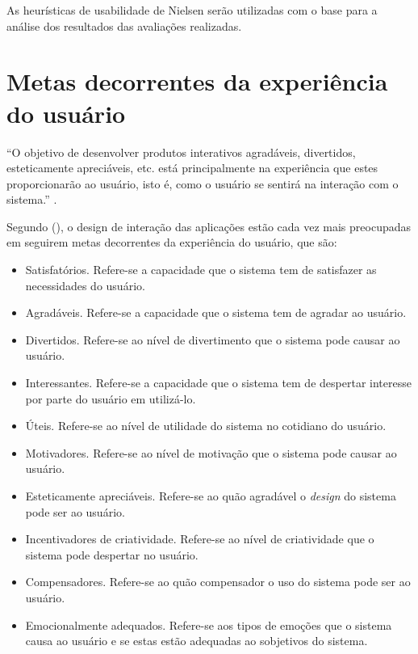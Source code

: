     As heurísticas de usabilidade de Nielsen serão utilizadas com o base para a análise dos resultados das avaliações realizadas.
      
  \section{Metas decorrentes da experiência do usuário}
    
    “O objetivo de desenvolver produtos interativos agradáveis, divertidos, esteticamente apreciáveis, etc. 
    está principalmente na experiência que estes proporcionarão ao usuário, isto é, como o usuário se 
    sentirá na interação com o sistema.” \cite{preece}.
    
    Segundo \citeauthor{preece} (\citeyear{preece}), o design de interação das aplicações estão cada vez mais preocupadas em seguirem 
    metas decorrentes da experiência do usuário, que são:
    
    \begin{itemize}
       \item Satisfatórios.
       \subitem Refere-se a capacidade que o sistema tem de satisfazer as necessidades do usuário.

       \item Agradáveis.
       \subitem Refere-se a capacidade que o sistema tem de agradar ao usuário.

       \item Divertidos.
       \subitem Refere-se ao nível de divertimento que o sistema pode causar ao usuário.

       \item Interessantes.
       \subitem Refere-se a capacidade que o sistema tem de despertar interesse por parte do usuário em utilizá-lo.

       \item Úteis.
       \subitem Refere-se ao nível de utilidade do sistema no cotidiano do usuário.

       \item Motivadores.
       \subitem Refere-se ao nível de motivação que o sistema pode causar ao usuário.

       \item Esteticamente apreciáveis.
       \subitem Refere-se ao quão agradável o \textit{design} do sistema pode ser ao usuário.

       \item Incentivadores de criatividade.
       \subitem Refere-se ao nível de criatividade que o sistema pode despertar no usuário.

       \item Compensadores.
       \subitem Refere-se ao quão compensador o uso do sistema pode ser ao usuário.

       \item Emocionalmente adequados.
       \subitem Refere-se aos tipos de emoções que o sistema causa ao usuário e se estas estão adequadas ao sobjetivos do sistema.
    \end{itemize}    
    
